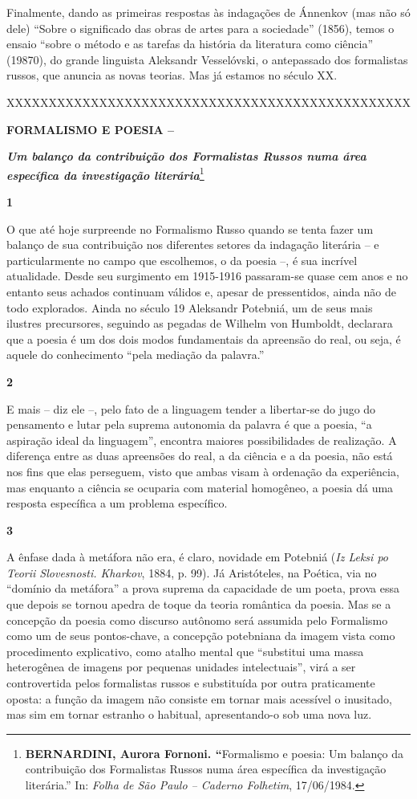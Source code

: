 Finalmente, dando as primeiras respostas às indagações de Ánnenkov (mas
não só dele) ``Sobre o significado das obras de artes para a sociedade''
(1856), temos o ensaio ``sobre o método e as tarefas da história da
literatura como ciência'' (19870), do grande linguista Aleksandr
Vesselóvski, o antepassado dos formalistas russos, que anuncia as novas
teorias. Mas já estamos no século XX.

XXXXXXXXXXXXXXXXXXXXXXXXXXXXXXXXXXXXXXXXXXXXXXXX

\textbf{FORMALISMO E POESIA --}

\emph{\textbf{Um balanço da contribuição dos Formalistas Russos numa
área específica da investigação literária}}\footnote{\textbf{BERNARDINI,
  Aurora Fornoni. ``}Formalismo e poesia: Um balanço da contribuição dos
  Formalistas Russos numa área específica da investigação literária.''
  In: \emph{Folha de São Paulo -- Caderno Folhetim}, 17/06/1984.}

\textbf{1}

O que até hoje surpreende no Formalismo Russo quando se tenta fazer um
balanço de sua contribuição nos diferentes setores da indagação
literária -- e particularmente no campo que escolhemos, o da poesia --,
é sua incrível atualidade. Desde seu surgimento em 1915-1916 passaram-se
quase cem anos e no entanto seus achados continuam válidos e, apesar de
pressentidos, ainda não de todo explorados. Ainda no século 19 Aleksandr
Potebniá, um de seus mais ilustres precursores, seguindo as pegadas de
Wilhelm von Humboldt, declarara que a poesia é um dos dois modos
fundamentais da apreensão do real, ou seja, é aquele do conhecimento
``pela mediação da palavra.''

\textbf{2}

E mais -- diz ele --, pelo fato de a linguagem tender a libertar-se do
jugo do pensamento e lutar pela suprema autonomia da palavra é que a
poesia, ``a aspiração ideal da linguagem'', encontra maiores
possibilidades de realização. A diferença entre as duas apreensões do
real, a da ciência e a da poesia, não está nos fins que elas perseguem,
visto que ambas visam à ordenação da experiência, mas enquanto a ciência
se ocuparia com material homogêneo, a poesia dá uma resposta específica
a um problema específico.

\textbf{3}

A ênfase dada à metáfora não era, é claro, novidade em Potebniá
(\emph{Iz Leksi po Teorii Slovesnosti. Kharkov}, 1884, p. 99). Já
Aristóteles, na Poética, via no ``domínio da metáfora'' a prova suprema
da capacidade de um poeta, prova essa que depois se tornou apedra de
toque da teoria romântica da poesia. Mas se a concepção da poesia como
discurso autônomo será assumida pelo Formalismo como um de seus
pontos-chave, a concepção potebniana da imagem vista como procedimento
explicativo, como atalho mental que ``substitui uma massa heterogênea de
imagens por pequenas unidades intelectuais'', virá a ser controvertida
pelos formalistas russos e substituída por outra praticamente oposta: a
função da imagem não consiste em tornar mais acessível o inusitado, mas
sim em tornar estranho o habitual, apresentando-o sob uma nova luz.

